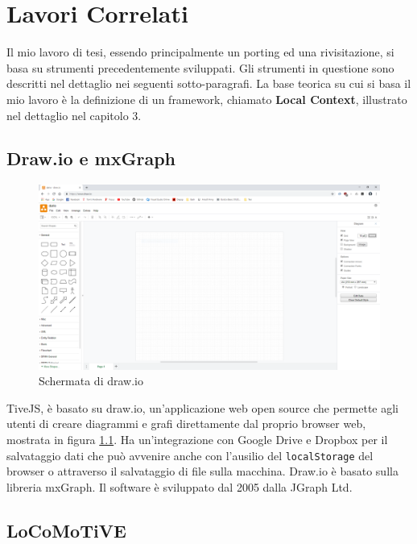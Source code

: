 ﻿\chapter{Lavori Correlati}
    Il mio lavoro di tesi, essendo principalmente un porting ed una rivisitazione, si basa su strumenti precedentemente sviluppati. Gli strumenti in questione sono descritti nel dettaglio nei seguenti sotto-paragrafi.
    \newline
    La base teorica su cui si basa il mio lavoro è la definizione di un framework, chiamato \textbf{Local Context}, illustrato nel dettaglio nel capitolo 3.

    \section{Draw.io e mxGraph}

        \begin{figure}[htbp]
            \centering
            \includegraphics[scale=0.17]{Figure/drawio.png}
            \caption{Schermata di draw.io}
            \label{fig:drawio}
        \end{figure}

        TiveJS, è basato su draw.io, un'applicazione web open source che permette agli utenti di creare diagrammi e grafi direttamente dal proprio browser web, mostrata in figura \ref{fig:drawio}. Ha un'integrazione con Google Drive e Dropbox per il salvataggio dati che può avvenire anche con l'ausilio del \texttt{localStorage} del browser o attraverso il salvataggio di file sulla macchina. Draw.io è basato sulla libreria mxGraph. Il software è sviluppato dal 2005 dalla JGraph Ltd.

    \section{LoCoMoTiVE}
        

